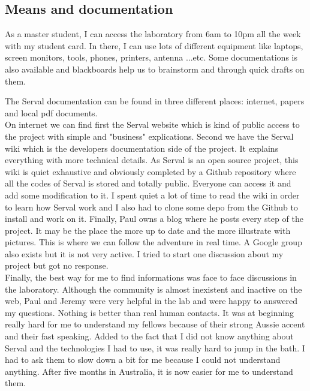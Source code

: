\subsection{Means and documentation}
As a master student, I can access the laboratory from 6am to 10pm all the week with my student card. In there, I can use lots of different equipment like laptops, screen monitors, tools, phones, printers, antenna ...etc. Some documentations is also available and blackboards help us to brainstorm and through quick drafts on them.
\par
The Serval documentation can be found in three different places: internet, papers and local pdf documents. 
\\
On internet we can find first the Serval website which is kind of public access to the project with simple and "business" explications. Second we have the Serval wiki which is the developers documentation side of the project. It explains everything with more technical details. As Serval is an open source project, this wiki is quiet exhaustive and obviously completed by a Github repository where all the codes of Serval is stored and totally public. Everyone can access it and add some modification to it. I spent quiet a lot of time to read the wiki in order to learn how Serval work and I also had to clone some depo from the Github to install and work on it. Finally, Paul owns a blog where he posts every step of the project. It may be the place the more up to date and the more illustrate with pictures. This is where we can follow the adventure in real time. A Google group also exists but it is not very active. I tried to start one discussion about my project but got no response.
\\Finally, the best way for me to find informations was face to face discussions in the laboratory. Although the community is almost inexistent and inactive on the web, Paul and Jeremy were very helpful in the lab and were happy to answered my questions. Nothing is better than real human contacts. It was at beginning really hard for me to understand my fellows because of their strong Aussie accent and their fast speaking. Added to the fact that I did not know anything about Serval and the technologies I had to use, it was really hard to jump in the bath. I had to ask them to slow down a bit for me because I could not understand anything. After five months in Australia, it is now easier for me to understand them.  

